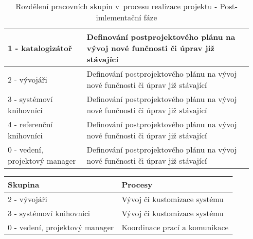 \documentclass[
	11pt, oneside, printed, draft, 
	table,   %
	lof,     %
	lot     %
]{fithesis3}
\newcommand{\bold}[1]{\textbf{#1}}
\begin{document}
{\begin{table}
\begin{tabular}{| p{3cm} | p{8.3cm} |}
	1 - katalogizátoř
    & 
	Definování postprojektového plánu na vývoj nové funčnosti či úprav již stávající
    \\ \hline
    
	2 - vývojáři
    & 
	Definování postprojektového plánu na vývoj nové funčnosti či úprav již stávající
    \\ \hline
    
	3 - systémoví knihovníci
    & 
    Definování postprojektového plánu na vývoj nové funčnosti či úprav již stávající
    \\ \hline
    
	4 - referenční knihovníci
    & 
    Definování postprojektového plánu na vývoj nové funčnosti či úprav již stávající
    \\ \hline
    
	0 - vedení, projektový manager
    & 
    Definování postprojektového plánu na vývoj nové funčnosti či úprav již stávající
    \\ \hline
    
    \end{tabular}
    \caption{Rozdělení pracovních skupin v~procesu realizace projektu - Post-imlementační fáze}
\end{table}

\begin{table}
    \centering
    \begin{tabular}{| p{3cm} | p{8.3cm} |}
    \hline
    \bold{Skupina} 	
    & 
    \bold{Procesy} 
    \\ \hline
    
	2 - vývojáři
    & 
	Vývoj či kustomizace systému
    \\ \hline
    
	3 - systémoví knihovníci
    & 
    Vývoj či kustomizace systému
    \\ \hline
    
	0 - vedení, projektový manager
    & 
    Koordinace prací a komunikace
    \\ \hline
    

\end{tabular}
\end{table}}
\end{document}
